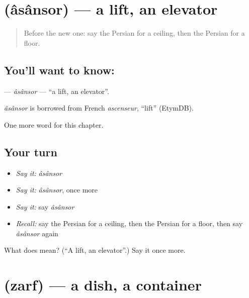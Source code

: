 \section[\texorpdfstring{\fa{آسانسور} (âsânsor)}{آسانسور (âsânsor)}]{ (âsânsor) — a lift, an elevator}

\label{lesson:FA-C203-asansor}



\begin{quote}
Before the new one: say the Persian for a ceiling, then the Persian for a floor.
\end{quote}

\subsection*{You'll want to know: }
\textbf{} — \emph{âsânsor} — \textquotedblleft{}a lift, an elevator\textquotedblright{}.

\begin{cousinweb}
\emph{âsânsor} is borrowed from French \emph{ascenseur}, \textquotedblleft{}lift\textquotedblright{} (EtymDB).
\end{cousinweb}

\begin{grammarlens}[title={What you've built}]
One more word for this chapter.
\end{grammarlens}

\subsection*{Your turn}
\begin{itemize}
\raggedright
  \item \emph{Say it:} \emph{âsânsor}
  \item \emph{Say it:} \emph{âsânsor}, once more
  \item \emph{Say it:} say \emph{âsânsor}
  \item \emph{Recall:} say the Persian for a ceiling, then the Persian for a floor, then say \emph{âsânsor} again
\end{itemize}

\begin{tcolorbox}[breakable,colback=teal!4,colframe=teal!35!black,title={Before you move on}]
What does  mean? (\textquotedblleft{}A lift, an elevator\textquotedblright{}.) Say it once more.
\end{tcolorbox}
\section[\texorpdfstring{\fa{ظرف} (zarf)}{ظرف (zarf)}]{ (zarf) — a dish, a container}

